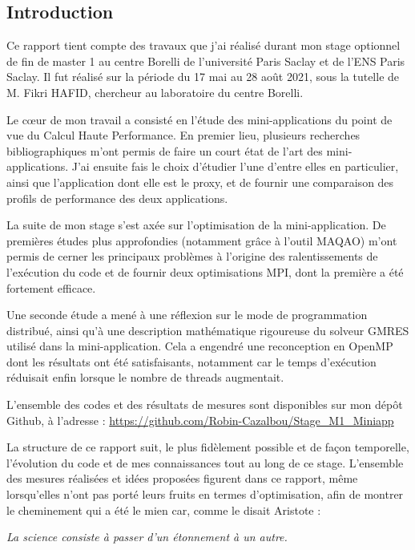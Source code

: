 \documentclass[11pt,a4paper,oneside]{memoir}
\theoremstyle{definition}
\theoremstyle{remark}
\theoremstyle{plain}
\begin{document}
\newpage
\begin{KeepFromToc}
  \tableofcontents
\end{KeepFromToc}



\begin{vplace}[0.5]


\chapter*{Introduction}

Ce rapport tient compte des travaux que j'ai réalisé durant mon stage optionnel de fin de master 1 au centre Borelli de l'université Paris Saclay et de l'ENS Paris Saclay. Il fut réalisé sur la période du 17 mai au 28 août 2021, sous la tutelle de M. Fikri HAFID, chercheur au laboratoire du centre Borelli. \bigskip

Le cœur de mon travail a consisté en l'étude des mini-applications du point de vue du Calcul Haute Performance. En premier lieu, plusieurs recherches bibliographiques m'ont permis de faire un court état de l'art des mini-applications. J'ai ensuite fais le choix d'étudier l'une d'entre elles en particulier, ainsi que l'application dont elle est le proxy, et de fournir une comparaison des profils de performance des deux applications.

La suite de mon stage s'est axée sur l'optimisation de la mini-application. De premières études plus approfondies (notamment grâce à l'outil MAQAO) m'ont permis de cerner les principaux problèmes à l'origine des ralentissements de l'exécution du code et de fournir deux optimisations MPI, dont la première a été fortement efficace.

Une seconde étude a mené à une réflexion sur le mode de programmation distribué, ainsi qu'à une description mathématique rigoureuse du solveur GMRES utilisé dans la mini-application. Cela a engendré une reconception en OpenMP dont les résultats ont été satisfaisants, notamment car le temps d'exécution réduisait enfin lorsque le nombre de threads augmentait.\bigskip

L'ensemble des codes et des résultats de mesures sont disponibles sur mon dépôt Github, à l'adresse :
\url{https://github.com/Robin-Cazalbou/Stage_M1_Miniapp}\bigskip

La structure de ce rapport suit, le plus fidèlement possible et de façon temporelle, l'évolution du code et de mes connaissances tout au long de ce stage. L'ensemble des mesures réalisées et idées proposées figurent dans ce rapport, même lorsqu'elles n'ont pas porté leurs fruits en termes d'optimisation, afin de montrer le cheminement qui a été le mien car, comme le disait Aristote : \medskip

\begin{center}
\textit{La science consiste à passer d'un étonnement à un autre.}
\end{center}



\end{vplace}
\end{document}
